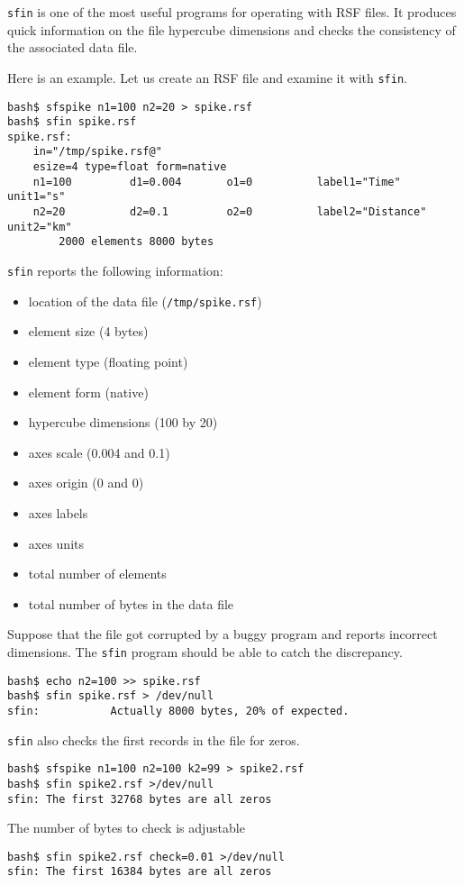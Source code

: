 \noindent\doublebox{\parbox{\textwidth}{
    
  }}

\texttt{sfin} is one of the most useful programs for operating with
RSF files. It produces quick information on the file hypercube
dimensions and checks the consistency of the associated data file.

Here is an example. Let us create an RSF file and examine it with \texttt{sfin}.
\begin{verbatim}
bash$ sfspike n1=100 n2=20 > spike.rsf
bash$ sfin spike.rsf
spike.rsf:
    in="/tmp/spike.rsf@"
    esize=4 type=float form=native
    n1=100         d1=0.004       o1=0          label1="Time" unit1="s"
    n2=20          d2=0.1         o2=0          label2="Distance" unit2="km"
        2000 elements 8000 bytes
\end{verbatim}
\texttt{sfin} reports the following information:
\begin{itemize}
\item location of the data file (\texttt{/tmp/spike.rsf\@})
\item element size (4 bytes)
\item element type (floating point)
\item element form (native)
\item hypercube dimensions (100 by 20)
\item axes scale (0.004 and 0.1)
\item axes origin (0 and 0)
\item axes labels
\item axes units
\item total number of elements
\item total number of bytes in the data file
\end{itemize}

Suppose that the file got corrupted by a buggy program and reports
incorrect dimensions. The \texttt{sfin} program should be able to
catch the discrepancy.
\begin{verbatim}
bash$ echo n2=100 >> spike.rsf
bash$ sfin spike.rsf > /dev/null
sfin:           Actually 8000 bytes, 20% of expected.
\end{verbatim}

\texttt{sfin} also checks the first records in the file for zeros. 
\begin{verbatim}
bash$ sfspike n1=100 n2=100 k2=99 > spike2.rsf
bash$ sfin spike2.rsf >/dev/null
sfin: The first 32768 bytes are all zeros
\end{verbatim}
The number of bytes to check is adjustable
\begin{verbatim}
bash$ sfin spike2.rsf check=0.01 >/dev/null
sfin: The first 16384 bytes are all zeros
\end{verbatim}

